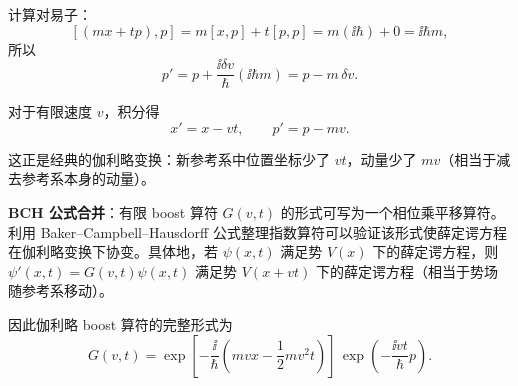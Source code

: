 \begin{solution}
	计算对易子：
	\[
	[(mx+tp),p] = m[x,p] + t[p,p] = m(\ii\hbar) + 0 = \ii\hbar m,
	\]
	所以
	\[
	p' = p + \frac{\ii\delta v}{\hbar}(\ii\hbar m) = p - m\,\delta v.
	\]

	对于有限速度 $v$，积分得
	\[
	\boxed{x' = x - vt},\qquad
	\boxed{p' = p - mv}.
	\]

	这正是经典的伽利略变换：新参考系中位置坐标少了 $vt$，动量少了 $mv$（相当于减去参考系本身的动量）。

	\textbf{BCH 公式合并}：有限 boost 算符 $G(v,t)$ 的形式可写为一个相位乘平移算符。利用 Baker--Campbell--Hausdorff 公式整理指数算符可以验证该形式使薛定谔方程在伽利略变换下协变。具体地，若 $\psi(x,t)$ 满足势 $V(x)$ 下的薛定谔方程，则 $\psi'(x,t)=G(v,t)\psi(x,t)$ 满足势 $V(x+vt)$ 下的薛定谔方程（相当于势场随参考系移动）。

	因此伽利略 boost 算符的完整形式为
	\[
	\boxed{G(v,t)=\exp\!\left[-\frac{\ii}{\hbar}\left(mvx-\frac12 mv^2t\right)\right]\,\exp\!\left(-\frac{\ii v t}{\hbar}p\right)}.
	\]
	\end{solution}

